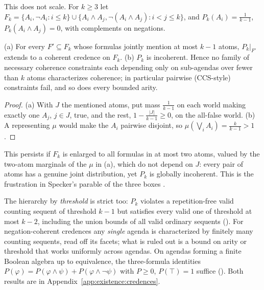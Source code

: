 This does not scale. For $k\ge3$ let $F_k=\{A_i,\neg A_i:i\le k\}\cup\{A_i\wedge A_j,\neg(A_i\wedge A_j):i<j\le k\}$, and $P_k(A_i)=\frac1{k-1}$, $P_k(A_i\wedge A_j)=0$, with complements on negations.

\begin{theorem}\label{thm:existence:arity}
\textup{(a)} For every $F'\subseteq F_k$ whose formulas jointly mention at most $k-1$ atoms, $P_k|_{F'}$ extends to a coherent credence on $F_k$. \textup{(b)} $P_k$ is incoherent. Hence no family of necessary coherence constraints each depending only on sub-agendas over fewer than $k$ atoms characterizes coherence; in particular pairwise (CCS-style) constraints fail, and so does every bounded arity.
\hfill{}
\end{theorem}

\begin{proof}
(a) With $J$ the mentioned atoms, put mass $\frac1{k-1}$ on each world making exactly one $A_j$, $j\in J$, true, and the rest, $1-\frac{|J|}{k-1}\ge0$, on the all-false world. (b) A representing $\mu$ would make the $A_i$ pairwise disjoint, so $\mu(\bigvee_iA_i)=\frac k{k-1}>1$.
\end{proof}

This persists if $F_k$ is enlarged to all formulas in at most two atoms, valued by the two-atom marginals of the $\mu$ in (a), which do not depend on $J$: every pair of atoms has a genuine joint distribution, yet $P_k$ is globally incoherent. This is the frustration in Specker's parable of the three boxes \citep{specker1960logik}.

The hierarchy by \emph{threshold} is strict too: $P_k$ violates a repetition-free valid counting sequent of threshold $k-1$ but satisfies every valid one of threshold at most $k-2$, including the union bounds of all valid ordinary sequents (). For negation-coherent credences any \emph{single} agenda is characterized by finitely many counting sequents, read off its facets; what is ruled out is a bound on arity or threshold that works uniformly across agendas. On agendas forming a finite Boolean algebra up to equivalence, the three-formula identities $P(\varphi)=P(\varphi\wedge\psi)+P(\varphi\wedge\neg\psi)$ with $P\ge0$, $P(\top)=1$ suffice (). Both results are in Appendix~\ref{app:existence:credences}.

